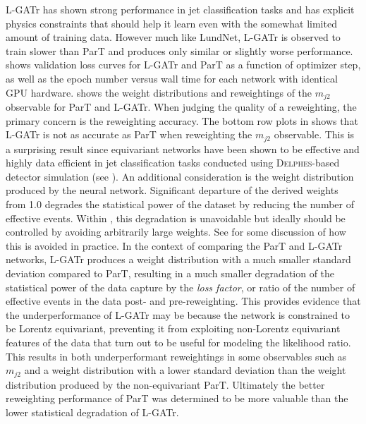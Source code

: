 L-GATr has shown strong performance in jet classification tasks and has explicit physics constraints that should help it learn even with the somewhat limited amount of training data.
However much like LundNet, L-GATr is observed to train slower than ParT and produces only similar or slightly worse performance. 
 shows validation loss curves for L-GATr and ParT as a function of optimizer step, as well as the epoch number versus wall time for each network with identical GPU hardware.
 shows the weight distributions and reweightings of the $m_{j2}$ observable for ParT and L-GATr.
When judging the quality of a reweighting, the primary concern is the reweighting accuracy.
The bottom row plots in  shows that L-GATr is not as accurate as ParT when reweighting the $m_{j2}$ observable.
This is a surprising result since equivariant networks have been shown to be effective and highly data efficient in jet classification tasks conducted using \textsc{Delphes}-based detector simulation (see ).
An additional consideration is the weight distribution produced by the neural network.
Significant departure of the derived weights from 1.0 degrades the statistical power of the dataset by reducing the number of effective events.
Within \Omnifold, this degradation is unavoidable but ideally should be controlled by avoiding arbitrarily large weights.
See  for some discussion of how this is avoided in practice.
In the context of comparing the ParT and L-GATr networks, L-GATr produces a weight distribution with a much smaller standard deviation compared to ParT, resulting in a much smaller degradation of the statistical power of the data capture by the \textit{loss factor}, or ratio of the number of effective events in the data post- and pre-reweighting.
This provides evidence that the underperformance of L-GATr may be because the network is constrained to be Lorentz equivariant, preventing it from exploiting non-Lorentz equivariant features of the data that turn out to be useful for modeling the likelihood ratio.
This results in both underperformant reweightings in some observables such as $m_{j2}$ and a weight distribution with a lower standard deviation than the weight distribution produced by the non-equivariant ParT.
Ultimately the better reweighting performance of ParT was determined to be more valuable than the lower statistical degradation of L-GATr.

